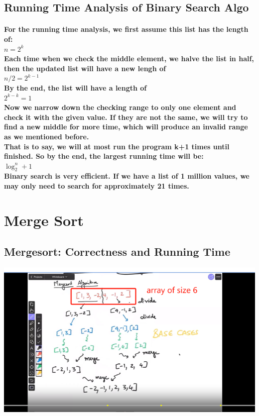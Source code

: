 \documentclass{article}
\begin{document}
\subsection{Running Time Analysis of Binary Search Algo}

\paragraph{For the running time analysis, we first assume this list has the length of:\\
$n = 2^k$\\
Each time when we check the middle element, we halve the list in half, then the updated list will have a new lengh of\\
$n/2 = 2^{k-1}$\\
By the end, the list will have a length of\\
$2^{k-k} = 1$\\
Now we narrow down the checking range to only one element and check it with the given value. If they are not the same, we will try to find a new middle for more time, which will produce an invalid range as we mentioned before.\\
That is to say, we will at most run the program k+1 times until finished. So by the end, the largest running time will be: \\
$\log_2^n + 1$\\
Binary search is very efficient. If we have a list of 1 million values, we may only need to search for approximately 21 times.}


\newpage

\section{Merge Sort}

\subsection{Mergesort: Correctness and Running Time}

\includegraphics[width=\textwidth]{mergesort}
\end{document}

